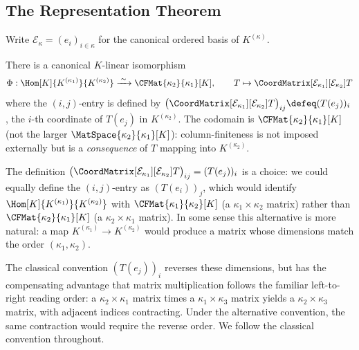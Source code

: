 
\newpage
\subsection{The Representation Theorem}

Write $\mathcal{E}_\kappa = (e_i)_{i \in \kappa}$ for the canonical ordered basis of
$K^{(\kappa)}$.

\begin{theorem}
\label{thm:rep-thm}
    There is a canonical $K$-linear isomorphism
    \[
        \Phi: \Hom[K]{K^{(\kappa_1)}}{K^{(\kappa_2)}} \xrightarrow{\;\sim\;}
        \CFMat{\kappa_2}{\kappa_1}[K],
        \qquad T \mapsto \CoordMatrix[\mathcal{E}_{\kappa_1}][\mathcal{E}_{\kappa_2}]{T}
    \]
    where the $(i,j)$-entry is defined by
    $\bigl(\CoordMatrix[\mathcal{E}_{\kappa_1}][\mathcal{E}_{\kappa_2}]{T}\bigr)_{ij}
    \defeq (T(e_j))_i$, the $i$-th coordinate of $T(e_j)$ in $K^{(\kappa_2)}$.
    The codomain is $\CFMat{\kappa_2}{\kappa_1}[K]$ (not the larger
    $\MatSpace{\kappa_2}{\kappa_1}[K]$): column-finiteness is not imposed externally but is a
    \emph{consequence} of $T$ mapping into $K^{(\kappa_2)}$.
\end{theorem}

\begin{remark}
    The definition $\bigl(\CoordMatrix[\mathcal{E}_{\kappa_1}][\mathcal{E}_{\kappa_2}]{T}
    \bigr)_{ij} = (T(e_j))_i$ is a choice: we could equally define the $(i,j)$-entry as
    $(T(e_i))_j$, which would identify $\Hom[K]{K^{(\kappa_1)}}{K^{(\kappa_2)}}$ with
    $\CFMat{\kappa_1}{\kappa_2}[K]$ (a $\kappa_1 \times \kappa_2$ matrix) rather than
    $\CFMat{\kappa_2}{\kappa_1}[K]$ (a $\kappa_2 \times \kappa_1$ matrix). In some sense
    this alternative is more natural: a map $K^{(\kappa_1)} \to K^{(\kappa_2)}$ would produce
    a matrix whose dimensions match the order $(\kappa_1, \kappa_2)$.

    The classical convention $(T(e_j))_i$ reverses these dimensions, but has the compensating
    advantage that matrix multiplication follows the familiar left-to-right reading order:
    a $\kappa_2 \times \kappa_1$ matrix times a $\kappa_1 \times \kappa_3$ matrix yields a
    $\kappa_2 \times \kappa_3$ matrix, with adjacent indices contracting. Under the alternative
    convention, the same contraction would require the reverse order. We follow the classical
    convention throughout.
\end{remark}

